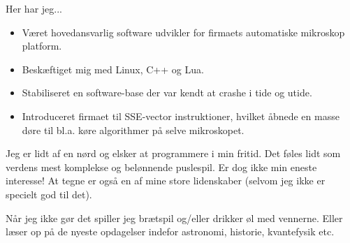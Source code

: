 \documentclass[10pt,a4paper,ragged2e]{altacv}
\begin{document}
Her har jeg...

\begin{itemize}
\item Været hovedansvarlig software udvikler for firmaets automatiske mikroskop platform.
\item Beskæftiget mig med Linux, C++ og Lua.
\item Stabiliseret en software-base der var kendt at crashe i tide og utide.
\item Introduceret firmaet til SSE-vector instruktioner, hvilket åbnede en masse døre til bl.a. køre algorithmer på selve mikroskopet.
\end{itemize}


Jeg er lidt af en nørd og elsker at programmere i min fritid. Det føles lidt som verdens mest komplekse og belønnende puslespil. Er dog ikke min eneste interesse! At tegne er også en af mine store lidenskaber (selvom jeg ikke er specielt god til det).

Når jeg ikke gør det spiller jeg brætspil og/eller drikker øl med vennerne. Eller læser op på de nyeste opdagelser indefor astronomi, historie, kvantefysik etc.

\clearpage


\nocite{*}

\printbibliography[heading=pubtype,title={\printinfo{\faFileTextO}{Journal Artikler}}, type=article]

\divider

\printbibliography[heading=pubtype,title={\printinfo{\faGroup}{Konference Artikler}},type=inproceedings]
\end{document}
